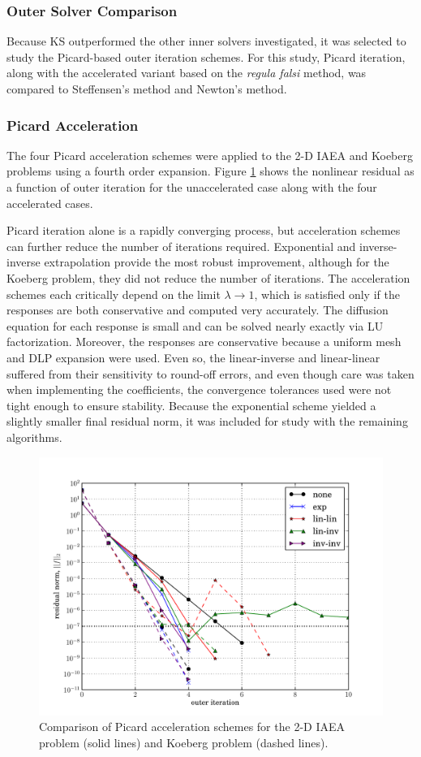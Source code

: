 \subsubsection{Outer Solver Comparison}

Because KS outperformed the other inner solvers investigated, it was 
selected to study the Picard-based outer iteration schemes.
For this study, Picard iteration, along with the accelerated variant 
based on the {\it regula falsi} method, was compared to Steffensen's 
method and Newton's method.  

\subsubsection{Picard Acceleration}

The four Picard acceleration schemes were applied to the 2-D IAEA 
and Koeberg problems
using a fourth order expansion.  
Figure \ref{fig:diffusion_picard_acceleration}
shows the nonlinear residual as a function of outer iteration for the 
unaccelerated case along with the four accelerated cases. 

Picard iteration alone is a 
rapidly converging process, but acceleration schemes
can further reduce the number of iterations required.
Exponential and inverse-inverse extrapolation provide the 
most robust improvement, although for the Koeberg problem, 
they did not reduce the number of iterations.
The acceleration schemes each critically depend
on the limit $\lambda \to 1$, which is satisfied only if the responses are 
both conservative and computed very accurately.  The 
diffusion equation for each response is small and can be 
solved nearly exactly via LU factorization.  Moreover, the responses 
are conservative 
because a uniform mesh and DLP expansion were used. 
Even so, the linear-inverse and linear-linear suffered from their 
sensitivity to round-off errors, and even though care was taken when 
implementing the coefficients, the convergence tolerances used were 
not tight enough to ensure stability. Because the exponential 
scheme yielded a slightly smaller final residual norm, it was 
included for study with the remaining algorithms.
 
\begin{figure}[ht]
    \centering
    \includegraphics[keepaspectratio, width = 3.5 in]
                    {diffusion_picard_acceleration}
    \caption{Comparison of Picard acceleration schemes for the 
             2-D IAEA problem (solid lines) and Koeberg 
             problem (dashed lines).  }
    \label{fig:diffusion_picard_acceleration}
\end{figure}

